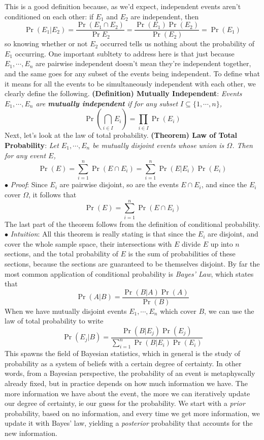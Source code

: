 \documentclass{article}
\newcommand*{\tb}{\textbf}
\newcommand*{\ti}{\textit}
\newcommand*{\n}{\newline}
\newcommand*{\nn}{\newline \newline}
\newcommand*{\Pf}{\indent \ensuremath{\bullet} \textit{Proof}: }
\newcommand*{\In}{\indent \ensuremath{\bullet} \textit{Intuition}: }
\begin{document}
This is a good definition because, as we'd expect, independent events aren't conditioned on each other: if $ E_1 $ and $ E_2 $ are independent, then
$$ \Pr(E_1 | E_2) = \frac{\Pr(E_1 \cap E_2)}{\Pr{E_2}} = \frac{\Pr(E_1) \Pr(E_2)}{\Pr(E_2)} = \Pr(E_1) $$
so knowing whether or not $ E_2 $ occurred tells us nothing about the probability of $ E_1 $ occurring. One important subltety to address here is that just because $ E_1, \cdots, E_n $ are pairwise independent doesn't mean they're independent together, and the same goes for any subset of the events being independent. To define what it means for all the events to be simultaneously independent with each other, we clearly define the following.
\nn
\tb{(Definition) Mutually Independent}: \ti{Events $ E_1, \cdots, E_n $ are \tb{mutually independent} if for any subset $ I \subseteq \{ 1, \cdots, n \} $,}
$$ \Pr \left( \bigcap_{i \in I} E_i \right) = \prod_{i \in I} \Pr(E_i) $$
\nn
Next, let's look at the law of total probability.
\nn
\tb{(Theorem) Law of Total Probability}: \ti{Let $ E_1, \cdots, E_n $ be mutually disjoint events whose union is $ \Omega $. Then for any event $ E $,}
$$ \Pr(E) = \sum_{i = 1}^n \Pr(E \cap E_i) = \sum_{i = 1}^n \Pr(E | E_i) \Pr(E_i) $$
\n
\Pf Since $ E_i $ are pairwise disjoint, so are the events $ E \cap E_i $, and since the $ E_i $ cover $ \Omega $, it follows that
$$ \Pr(E) = \sum_{i = 1}^n \Pr(E \cap E_i) $$
The last part of the theorem follows from the definition of conditional probability. \qedsymbol
\n
\In All this theorem is really stating is that since the $ E_i $ are disjoint, and cover the whole sample space, their intersections with $ E $ divide $ E $ up into $ n $ sections, and the total probability of $ E $ is the sum of probabilities of these sections, because the sections are guaranteed to be themselves disjoint.
\nn
By far the most common application of conditional probability is \ti{Bayes' Law}, which states that
$$ \Pr(A | B) = \frac{\Pr(B | A) \Pr(A)}{\Pr(B)} $$
When we have mutually disjoint events $ E_1, \cdots, E_n $ which cover $ B $, we can use the law of total probability to write
$$ \Pr(E_j | B) = \frac{\Pr(B | E_j) \Pr(E_j)}{\sum_{i = 1}^n \Pr(B | E_i) \Pr(E_i)} $$
This spawns the field of Bayesian statistics, which in general is the study of probability as a system of beliefs with a certain degree of certainty. In other words, from a Bayesian perspective, the probability of an event is metaphyscally already fixed, but in practice depends on how much information we have. The more information we have about the event, the more we can iteratively update our degree of certainty, ie our guess for the probability. We start with a \ti{prior} probability, based on no information, and every time we get more information, we update it with Bayes' law, yielding a \ti{posterior} probability that accounts for the new information.
\end{document}
